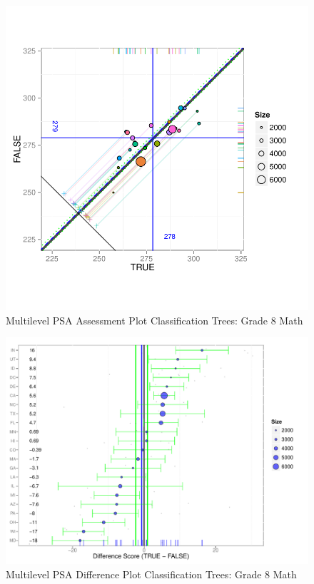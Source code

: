 \begin{figure}[h!]
\begin{center}
\includegraphics[width=\textwidth]{../Figures2009/g8math-mlpsa-ctree-circ.pdf}
\caption{Multilevel PSA Assessment Plot Classification Trees: Grade 8 Math}
\end{center}
\end{figure}

\begin{figure}[h!]
\begin{center}
\includegraphics[width=\textwidth]{../Figures2009/g8math-mlpsa-ctree-diff.pdf}
\caption{Multilevel PSA Difference Plot Classification Trees: Grade 8 Math}
\end{center}
\end{figure}


